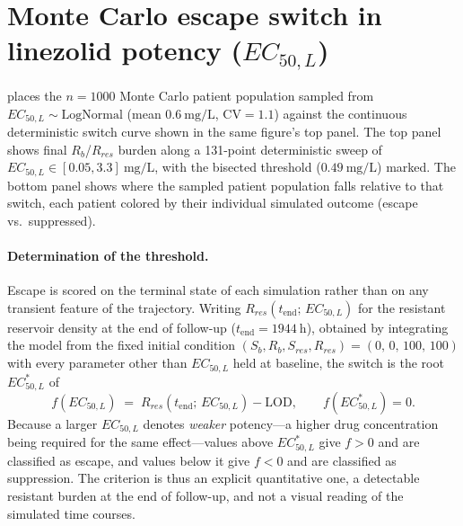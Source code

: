 \documentclass[11pt]{article}
\begin{document}
\section{Monte Carlo escape switch in linezolid potency ($EC_{50,L}$)}
\label{sec:s2}

 places the $n = 1000$ Monte Carlo patient
population sampled from $EC_{50,L} \sim \mathrm{LogNormal}$
(mean $0.6~\mathrm{mg/L}$, $\mathrm{CV} = 1.1$) against the continuous
deterministic switch curve shown in the same figure's top panel. The top
panel shows final $R_b$/$R_{res}$ burden along a 131-point deterministic
sweep of $EC_{50,L} \in [0.05, 3.3]~\mathrm{mg/L}$, with the bisected
threshold ($0.49~\mathrm{mg/L}$) marked. The bottom panel shows where the
sampled patient population falls relative to that switch, each patient
colored by their individual simulated outcome (escape vs.\ suppressed).

\paragraph{Determination of the threshold.}
Escape is scored on the terminal state of each simulation rather than on any
transient feature of the trajectory. Writing
$R_{res}(t_{\mathrm{end}};\,EC_{50,L})$ for the resistant reservoir density
at the end of follow-up ($t_{\mathrm{end}} = 1944~\mathrm{h}$), obtained by
integrating the model from the fixed initial condition
$(S_b, R_b, S_{res}, R_{res}) = (0,\,0,\,100,\,100)$ with every parameter
other than $EC_{50,L}$ held at baseline, the switch is the root
$EC_{50,L}^{*}$ of
\begin{equation}
  f(EC_{50,L}) \;=\; R_{res}\!\left(t_{\mathrm{end}};\,EC_{50,L}\right)
  - \mathrm{LOD},
  \qquad f\!\left(EC_{50,L}^{*}\right) = 0 .
  \label{eq:ec50_threshold}
\end{equation}
Because a larger $EC_{50,L}$ denotes \emph{weaker} potency---a higher drug
concentration being required for the same effect---values above
$EC_{50,L}^{*}$ give $f > 0$ and are classified as escape, and values below
it give $f < 0$ and are classified as suppression. The criterion is thus an
explicit quantitative one, a detectable resistant burden at the end of
follow-up, and not a visual reading of the simulated time courses.
\end{document}
